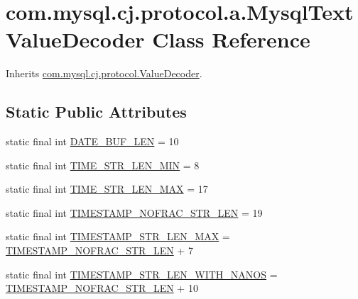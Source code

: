 \hypertarget{classcom_1_1mysql_1_1cj_1_1protocol_1_1a_1_1_mysql_text_value_decoder}{}\section{com.\+mysql.\+cj.\+protocol.\+a.\+Mysql\+Text\+Value\+Decoder Class Reference}
\label{classcom_1_1mysql_1_1cj_1_1protocol_1_1a_1_1_mysql_text_value_decoder}


Inherits \mbox{\hyperlink{interfacecom_1_1mysql_1_1cj_1_1protocol_1_1_value_decoder}{com.\+mysql.\+cj.\+protocol.\+Value\+Decoder}}.

\subsection*{Static Public Attributes}
\begin{DoxyCompactItemize}
\item 
static final int \mbox{\hyperlink{classcom_1_1mysql_1_1cj_1_1protocol_1_1a_1_1_mysql_text_value_decoder_ad74c2b34e9bdadb001053eba8200ef0a}{D\+A\+T\+E\+\_\+\+B\+U\+F\+\_\+\+L\+EN}} = 10
\item 
static final int \mbox{\hyperlink{classcom_1_1mysql_1_1cj_1_1protocol_1_1a_1_1_mysql_text_value_decoder_a36008c724f45f33bef588c9512a4e4d3}{T\+I\+M\+E\+\_\+\+S\+T\+R\+\_\+\+L\+E\+N\+\_\+\+M\+IN}} = 8
\item 
static final int \mbox{\hyperlink{classcom_1_1mysql_1_1cj_1_1protocol_1_1a_1_1_mysql_text_value_decoder_a52b40d9392ee253f42bf6b0b40e595a8}{T\+I\+M\+E\+\_\+\+S\+T\+R\+\_\+\+L\+E\+N\+\_\+\+M\+AX}} = 17
\item 
static final int \mbox{\hyperlink{classcom_1_1mysql_1_1cj_1_1protocol_1_1a_1_1_mysql_text_value_decoder_a8231f45af061c93c4b82283c5f00d0dc}{T\+I\+M\+E\+S\+T\+A\+M\+P\+\_\+\+N\+O\+F\+R\+A\+C\+\_\+\+S\+T\+R\+\_\+\+L\+EN}} = 19
\item 
static final int \mbox{\hyperlink{classcom_1_1mysql_1_1cj_1_1protocol_1_1a_1_1_mysql_text_value_decoder_ab5c28f2e213994f87306b36be8f01b2f}{T\+I\+M\+E\+S\+T\+A\+M\+P\+\_\+\+S\+T\+R\+\_\+\+L\+E\+N\+\_\+\+M\+AX}} = \mbox{\hyperlink{classcom_1_1mysql_1_1cj_1_1protocol_1_1a_1_1_mysql_text_value_decoder_a8231f45af061c93c4b82283c5f00d0dc}{T\+I\+M\+E\+S\+T\+A\+M\+P\+\_\+\+N\+O\+F\+R\+A\+C\+\_\+\+S\+T\+R\+\_\+\+L\+EN}} + 7
\item 
static final int \mbox{\hyperlink{classcom_1_1mysql_1_1cj_1_1protocol_1_1a_1_1_mysql_text_value_decoder_a79a11dfba22b1f847056904c57132565}{T\+I\+M\+E\+S\+T\+A\+M\+P\+\_\+\+S\+T\+R\+\_\+\+L\+E\+N\+\_\+\+W\+I\+T\+H\+\_\+\+N\+A\+N\+OS}} = \mbox{\hyperlink{classcom_1_1mysql_1_1cj_1_1protocol_1_1a_1_1_mysql_text_value_decoder_a8231f45af061c93c4b82283c5f00d0dc}{T\+I\+M\+E\+S\+T\+A\+M\+P\+\_\+\+N\+O\+F\+R\+A\+C\+\_\+\+S\+T\+R\+\_\+\+L\+EN}} + 10
\end{DoxyCompactItemize}
